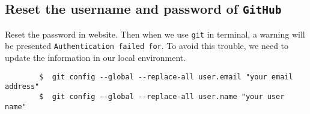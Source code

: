 \documentclass[10pt]{article}
\begin{document}
	

	\subsection{Reset the username and password of \texttt{GitHub}}

	Reset the password in website. Then when we use \texttt{git} in terminal, a warning will be presented \texttt{Authentication failed for}. To avoid this trouble, we need to update the information in our local environment.
	\begin{verbatim}
		$  git config --global --replace-all user.email "your email address"
		$  git config --global --replace-all user.name "your user name"
	\end{verbatim}
\end{document}
